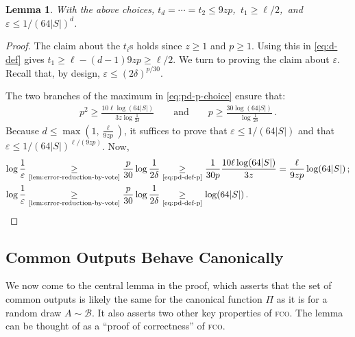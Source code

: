 \documentclass[10pt,a4paper]{article}
\newtheorem{lemma}[theorem]{Lemma}
\theoremstyle{definition}
\theoremstyle{remark}
\newcommand{\cB}{\mathcal{B}}
\let\epsilon\varepsilon
\newcommand{\fco}{\textsc{fco}\xspace}
\newcommand{\rl}{\mathbf{\ell}}             %
\begin{document}
\begin{itemize}
\begin{itemize}
\begin{lemma}\label{lem:pd-p-properties}
  With the above choices, $t_d = \cdots = t_2 \le 9zp$,\, $t_1 \ge \rl / 2$,\, and
  $\epsilon \le 1 / (64 |S|)^d$.
\end{lemma}
%
\begin{proof}%
  The claim about the $t_i$s holds since $z \ge 1$ and $p \ge 1$. Using this
  in \cref{eq:d-def} gives $t_1 \ge \rl - (d - 1) 9zp \ge \rl / 2$. We turn to
  proving the claim about $\epsilon$. Recall that, by design, $\epsilon \le
  (2\delta)^{p/30}$. 

  The two branches of the maximum in \cref{eq:pd-p-choice} ensure that:
  \begin{align}
    p^2 \ge \frac{10 \rl \log (64|S|)}{3 z \log \frac{1}{2\delta}} \qquad \text{and} \qquad p \ge \frac{30 \log(64|S|)}{\log \frac{1}{2\delta}}\,. \label{eq:pd-def-p}
  \end{align}
  Because $d \le \max(1, \frac{\rl}{9 z p})$, it suffices to prove that
  $\epsilon \le 1 / (64 |S|)$ and that $\epsilon \le 1 / (64 |S|)^{\rl / (9 z
  p)}$. Now,
  \begin{align*}
    \log \frac{1}{\epsilon}
    &\underset{\text{\Cref{lem:error-reduction-by-vote}}}{\ge} \frac{p}{30}
      \log \frac{1}{2\delta} \underset{\text{\cref{eq:pd-def-p}}}{\ge}
      \frac{1}{30 p} \frac{10 \rl \log(64 |S|)}{3z} = \frac{\rl}{9zp}
      \log(64|S|) \,; \\ 
    \log \frac{1}{\epsilon} 
    &\underset{\text{\Cref{lem:error-reduction-by-vote}}}{\ge} \frac{p}{30} 
      \log \frac{1}{2\delta} \underset{\text{\cref{eq:pd-def-p}}}{\ge} \log(64|S|) \,. \qedhere
  \end{align*}
\end{proof}


\subsection{Common Outputs Behave Canonically}

We now come to the central lemma in the proof, which asserts that the set of
common outputs is likely the same for the canonical function $\Pi$ as it is
for a random draw $A \sim \cB$. It also asserts two other key properties of
\fco. The lemma can be thought of as a ``proof of correctness'' of \fco.


\end{itemize}
\end{itemize}
\end{document}
